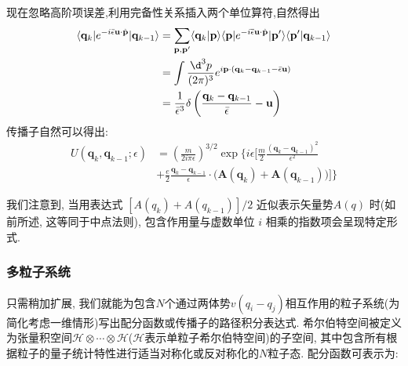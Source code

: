 现在忽略高阶项误差,利用完备性关系插入两个单位算符,自然得出
\begin{equation}
    \begin{aligned}
        \langle\mathbf{q}_{k}|e^{-i\bar{\epsilon}\mathbf{u}\cdot\hat{\mathbf{p}}}|\mathbf{q}_{k-1}\rangle
        &=\sum_{\mathbf{p},\mathbf{p}^{\prime}}\langle\mathbf{q}_k|\mathbf{p}\rangle\langle\mathbf{p}|e^{-i\overline{\epsilon}\mathbf{u}\cdot\hat{\mathbf{p}}}|\mathbf{p}^{\prime}\rangle\langle\mathbf{p}^{\prime}|\mathbf{q}_{k-1}\rangle\\
        &=\int\frac{\d^3p}{(2\pi)^3}e^{i\mathbf{p}\cdot(\mathbf{q}_k-\mathbf{q}_{k-1}-\bar{\epsilon}\mathbf{u})}\\
        &=\frac{1}{\bar{\epsilon}^3}\delta\left(\frac{\mathbf{q}_k-\mathbf{q}_{k-1}}{\bar{\epsilon}}-\mathbf{u}\right)
    \end{aligned}
\end{equation}
传播子自然可以得出:
\begin{equation}
    \begin{aligned}U(\mathbf{q}_k,\mathbf{q}_{k-1};\epsilon)&= \left(\frac{m}{2i\pi\epsilon}\right)^{3/2}\exp\biggl\{i\epsilon\biggl[\frac{m}{2}\frac{(\mathbf{q}_k-\mathbf{q}_{k-1})^2}{\epsilon^2}\\&+\frac{e}{2}\frac{\mathbf{q}_k-\mathbf{q}_{k-1}}{\epsilon}\cdot\bigl(\mathbf{A}(\mathbf{q}_k)+\mathbf{A}(\mathbf{q}_{k-1})\bigr)\biggr]\biggr\}\end{aligned}
\end{equation}

我们注意到, 当用表达式 $[A(q_k) + A(q_{k-1})]/2$ 近似表示矢量势$A(q)$ 时(如前所述, 这等同于中点法则), 包含作用量与虚数单位 $i$ 相乘的指数项会呈现特定形式.
\subsubsection{多粒子系统}
只需稍加扩展, 我们就能为包含$N$个通过两体势$v(q_i-q_j)$相互作用的粒子系统(为简化考虑一维情形)写出配分函数或传播子的路径积分表达式. 希尔伯特空间被定义为张量积空间$\mathcal{H}\otimes\cdots\otimes\mathcal{H}$($\mathcal{H}$表示单粒子希尔伯特空间)的子空间, 其中包含所有根据粒子的量子统计特性进行适当对称化或反对称化的$N$粒子态. 配分函数可表示为:

